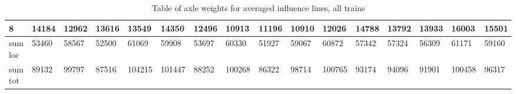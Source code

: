 \begin{table}[h]
\begin{adjustbox}{center}
\begin{tabularx}{\pagewidth}{ |X|X|X|X|X|X|X|X|X|X|X|X|X|X|X|X| }
      \hline
      8 & 14184   &   12962   &    13616   &    13549   &    14350    &   12496  &     10913    &   11196   &    10910   &    12026   &    14788   &    13792    &   13933   &   16003    &    15501  \\
      \hline
      sum loc & 53460   &   58567   &    52500   &    61069   &    59908    &   53697  &     60330    &   51927   &    59067   &    60872   &    57342   &    57324    &   56309   &   61171    &    59160  \\
      \hline
      sum tot & 89132 & 99797 & 87516 & 104215 & 101447 & 88252 & 100268 & 86322 & 98714 & 100765 & 93174 & 94096 & 91901 & 100458 & 96317  \\
      \hline
    \end{tabularx}
  \end{adjustbox}
  \caption{Table of axle weights for averaged influence lines, all trains}
  \label{table:all_trains_all sensors}
\end{table}

